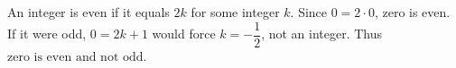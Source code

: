 An integer is even if it equals $ 2k $ for some integer $ k $. Since $ 0=2\cdot0 $, zero is even. If it were odd, $ 0=2k+1 $ would force $ k=-\dfrac{1}{2}$, not an integer. Thus $\boxed{\text{zero is even and not odd}}$.
